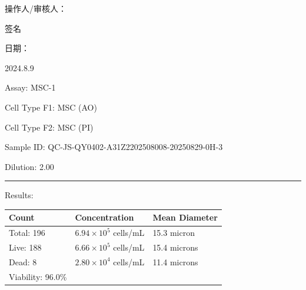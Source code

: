 \documentclass[UTF8,10pt,a4paper,fontset=fandol]{ctexart}
\newcommand{\fieldvalue}[1]{#1}
\newcommand{\handwritten}[1]{#1}
\begin{document}
\noindent
操作人/审核人：

\fieldvalue{\handwritten{签名}}

\hfill
日期：

\fieldvalue{\handwritten{2024.8.9}}

\newpage

Assay: %
\fieldvalue{MSC-1}

\vspace{0.5em}

Cell Type F1: %
\fieldvalue{MSC (AO)}

Cell Type F2: %
\fieldvalue{MSC (PI)}

\vspace{0.5em}

Sample ID: %
\fieldvalue{QC-JS-QY0402-A31Z2202508008-20250829-0H-3}

Dilution: %
\fieldvalue{2.00}

\vspace{1em}
\hrule
\vspace{0.5em}

Results:

\vspace{0.5em}

\begin{tabularx}{\textwidth}{@{}lXX@{}}
\textbf{Count} & \textbf{Concentration} & \textbf{Mean Diameter} \\
\hline
Total: %
\fieldvalue{196}
&
\fieldvalue{$6.94\times10^{5}$ cells/mL}
&
\fieldvalue{15.3 micron}
\\
Live: %
\fieldvalue{188}
&
\fieldvalue{$6.66\times10^{5}$ cells/mL}
&
\fieldvalue{15.4 microns}
\\
Dead: %
\fieldvalue{8}
&
\fieldvalue{$2.80\times10^{4}$ cells/mL}
&
\fieldvalue{11.4 microns}
\\
Viability: %
\fieldvalue{96.0\%}
&
&
\end{tabularx}
\end{document}
